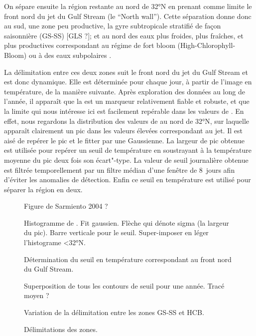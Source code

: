 \documentclass[index]{subfiles}
\begin{document}
On sépare ensuite la région restante au nord de \ang{32}N en prenant comme limite le front nord du jet du Gulf Stream (le \enquote{North wall}). Cette séparation donne donc au sud, une zone peu productive, la gyre subtropicale stratifié de façon saisonnière (GS-SS) [GLS ?]; et au nord des eaux plus froides, plus fraîches, et plus productives correspondant au régime de fort bloom (High-Chlorophyll-Bloom) \parencite{sarmiento_2004} ou à des eaux subpolaires \parencite{bock_2022}.

La délimitation entre ces deux zones suit le front nord du jet du Gulf Stream et est donc dynamique. Elle est déterminée pour chaque jour, à partir de l'image en température, de la manière suivante.
Après exploration des données au long de l'année, il apparaît que la  est un marqueur relativement fiable et robuste, et que la limite qui nous intéresse ici est facilement repérable dans les valeurs de .
En effet, nous regardons la distribution des valeurs de  au nord de \ang{32}N, sur laquelle apparaît clairement un pic dans les valeurs élevées correspondant au jet.
Il est aisé de repérer le pic et le fitter par une Gaussienne.
La largeur de pic obtenue est utilisée pour repérer un seuil de température en soustrayant à la température moyenne du pic deux fois son écart"-type.
La valeur de seuil journalière obtenue est filtrée temporellement par un filtre médian d'une fenêtre de 8~jours afin d'éviter les anomalies de détection.
Enfin ce seuil en température est utilisé pour séparer la région en deux.

\begin{figure}
  \caption{Figure de Sarmiento 2004 ?}
  \label{fig:sarmiento}
\end{figure}

\begin{figure}
  Histogramme de . Fit gaussien. Flèche qui dénote sigma (la largeur du pic).
  Barre verticale pour le seuil.
  Super-imposer en léger l'histograme <32°N.
  \caption{Détermination du seuil en température correspondant au front nord du Gulf Stream.}
  \label{fig:seuil-temp}
\end{figure}


\begin{figure}
  Superposition de tous les contours de seuil pour une année.
  Tracé moyen ?
  \caption{Variation de la délimitation entre les zones GS-SS et HCB.}
  \label{fig:var-delim}
\end{figure}


\begin{figure}
  \caption{Délimitations des zones.}
  \label{fig:zone-delimitation}
\end{figure}
\end{document}
